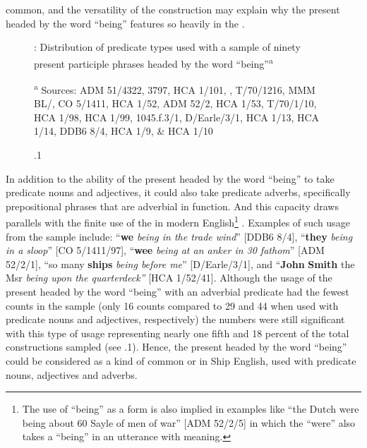 common, and the versatility of the construction may explain why the present  headed by the word “being” features so heavily in the . 

  
\begin{figure}

\caption{\label{fig:key:5}.1}: Distribution of predicate types used with a sample of ninety present participle phrases headed by the word “being”\textsuperscript{a} 

\textsuperscript{a} Sources: ADM 51/4322, 3797, HCA 1/101, \citealt{Brown2011}, T/70/1216, MMM BL/\citealt{Egerton2395}, CO 5/1411, HCA 1/52, ADM 52/2, HCA 1/53, T/70/1/10, HCA 1/98, HCA 1/99, 1045.f.3/1, D/Earle/3/1, HCA 1/13, HCA 1/14, DDB6 8/4, HCA 1/9, \& HCA 1/10
\end{figure}


In addition to the ability of the present  headed by the word “being” to take predicate nouns and adjectives, it could also take predicate adverbs, specifically prepositional phrases that are adverbial in function. And this capacity draws parallels with the finite use of the  in modern English\footnote{The use of “being” as a  form is also implied in examples like “the Dutch were being about 60 Sayle of men of war” [ADM 52/2/5] in which the  “were” also takes a  “being” in an utterance with  meaning.} . Examples of such usage from the sample include: “\textbf{we} \textit{being in the trade wind}” [DDB6 8/4], “\textbf{they} \textit{being in a sloop}” [CO 5/1411/97], “\textbf{wee} \textit{being at an anker in 30 fathom}” [ADM 52/2/1], “so many \textbf{ships} \textit{being before me}” [D/Earle/3/1], and “\textbf{John} \textbf{Smith} the Msr \textit{being upon the quarterdeck”} [HCA 1/52/41]. Although the usage of the present  headed by the word “being” with an adverbial predicate had the fewest counts in the sample (only 16 counts compared to 29 and 44 when used with predicate nouns and adjectives, respectively) the numbers were still significant with this type of usage representing nearly one fifth and 18 percent of the total constructions sampled (see .1). Hence, the present  headed by the word “being” could be considered as a kind of common  or  in Ship English, used with predicate nouns, adjectives and adverbs. 

